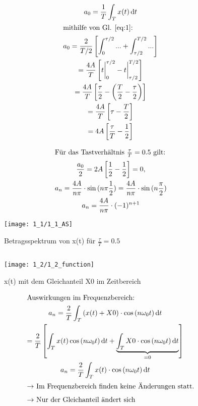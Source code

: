 \documentclass[a4paper, 12pt]{article}
\begin{document}
\begin{gather*}
	a_0 = \frac{1}{T} \int_T{x(t) \mathop{}\!\mathrm{d} t}\\
	\intertext{mithilfe von Gl. \ref{eq:1}:}
	a_0 = \frac{2}{T/2} \left[ \int_{0}^{\tau/2}{...} + \int_{\tau/2}^{T/2}{...} \right]\\
	= \frac{4 A}{T} \left[ t \bigg\rvert_{0}^{\tau/2} - t \bigg\rvert_{\tau/2}^{T/2}\right]\\
	= \frac{4 A}{T} \left[ \frac{\tau}{2} - \left( \frac{T}{2} - \frac{\tau}{2} \right)  \right]\\
	= \frac{4 A}{T} \left[ \tau - \frac{T}{2} \right]\\
	= 4 A \left[ \frac{\tau}{T} - \frac{1}{2} \right]
\end{gather*}



\holine{\textwidth}

\begin{gather*}
	\intertext{Für das Tastverhältnis $\frac{\tau}{T} = 0.5$  gilt:}
	\frac{a_0}{2} = 2 A \left[ \frac{1}{2} - \frac{1}{2}\right] = 0,\\
	a_n = \frac{4 A}{n \pi} \cdot \sin{(n \pi \frac{1}{2})} = \frac{4 A}{n \pi} \cdot \sin{(n \frac{\pi}{2})}\\
	a_n = \frac{4 A}{n \pi} \cdot (-1)^{n+1}
\end{gather*}

\begin{figure}[H]
  \texttt{[image: 1\_1/1\_1\_AS]}
	\caption{Betragsspektrum von x(t) für $\frac{\tau}{T} = 0.5$}
\end{figure}

\subsection{}

\begin{figure}[H]
  \texttt{[image: 1\_2/1\_2\_function]}
	\caption{x(t) mit dem Gleichanteil X0 im Zeitbereich}
\end{figure}

\begin{gather*}
  \intertext{Auswirkungen im Frequenzbereich:}
  a_n = \frac{2}{T} \int_{T}{(x(t) + X0) \cdot \cos{(n \omega_0 t)}\mathop{}\!\mathrm{d} t}\\
      = \frac{2}{T} \left[  \int_{T}{x(t) \cos{(n\omega_0 t)} \mathop{}\!\mathrm{d} t}+
        \underbrace{\int_T{X0 \cdot
          \cos{(n \omega_0 t)} \mathop{}\!\mathrm{d} t}}_{=0} \right]\\
  a_n = \frac{2}{T} \int_{T}{x(t) \cdot \cos{(n \omega_0 t)}\mathop{}\!\mathrm{d} t}\\
  \intertext{$\rightarrow$ Im Frequenzbereich finden keine Änderungen statt.}
  \intertext{$\rightarrow$ Nur der Gleichanteil ändert sich}
\end{gather*}
\end{document}
